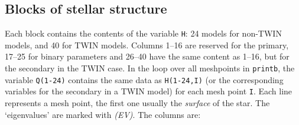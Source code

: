 \subsection{Blocks of stellar structure}
Each block contains the contents of the variable \texttt{H}: 24 models for non-TWIN models, 
and 40 for TWIN models.
Columns 1--16 are reserved for the primary, 17--25 for binary parameters
and 26--40 have the same content as 1--16, but for the secondary in the TWIN case.
In the loop over all meshpoints in \texttt{printb}, the variable \texttt{Q(1-24)} contains the
same data as \texttt{H(1-24,I)} (or the corresponding variables for the secondary in a TWIN model)
for each mesh point \texttt{I}.
Each line represents a mesh point, the first one usually the \emph{surface}
of the star.  The `eigenvalues' are marked with \emph{(EV)}.
The columns are:

